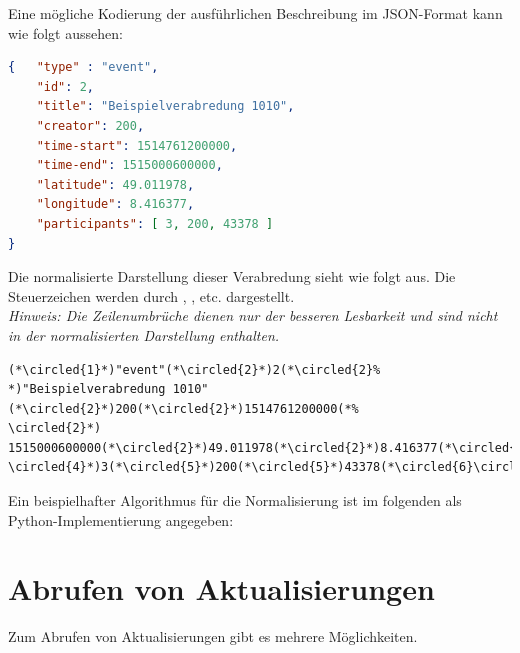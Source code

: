 \documentclass[parskip=full,11pt]{scrartcl}
\begin{document}
Eine mögliche Kodierung der ausführlichen Beschreibung im JSON-Format kann wie
folgt aussehen:
\begin{lstlisting}[language=json,firstnumber=1]
{   "type" : "event",
    "id": 2,
    "title": "Beispielverabredung 1010",
    "creator": 200,
    "time-start": 1514761200000,
    "time-end": 1515000600000,
    "latitude": 49.011978,
    "longitude": 8.416377,
    "participants": [ 3, 200, 43378 ]
}
\end{lstlisting}

\newcommand*\circled[1]{\tikz[baseline=(char.base)]{
            \node[shape=circle,draw,inner sep=1pt] (char) {\scriptsize #1};}}

Die normalisierte Darstellung dieser Verabredung sieht wie folgt aus.
Die Steuerzeichen werden durch \circled{1}, \circled{2}, \circled{3} etc.
dargestellt.\\
\textit{Hinweis: Die Zeilenumbrüche dienen nur der besseren Lesbarkeit und sind
nicht in der normalisierten Darstellung enthalten.}

\begin{lstlisting}[language=norm,firstnumber=1]
(*\circled{1}*)"event"(*\circled{2}*)2(*\circled{2}%
*)"Beispielverabredung 1010"(*\circled{2}*)200(*\circled{2}*)1514761200000(*%
\circled{2}*)
1515000600000(*\circled{2}*)49.011978(*\circled{2}*)8.416377(*\circled{2}%
\circled{4}*)3(*\circled{5}*)200(*\circled{5}*)43378(*\circled{6}\circled{3}*)
\end{lstlisting}

\par Ein beispielhafter Algorithmus für die Normalisierung ist im folgenden
als Python-Implementierung angegeben:


\section{Abrufen von Aktualisierungen}\label{sec:get-updates}
Zum Abrufen von Aktualisierungen gibt es mehrere Möglichkeiten.
\end{document}
